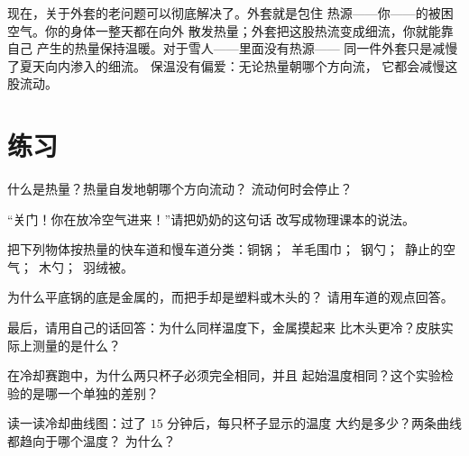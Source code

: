 \begin{remark}[保暖的正确说法]\label{rem:g5:heat-and-insulation:coat}
现在，关于外套的老问题可以彻底解决了。外套就是包住
热源——你——的被困空气。你的身体一整天都在向外
散发热量；外套把这股热流变成细流，你就能靠自己
产生的热量保持温暖。对于雪人——里面没有热源——
同一件外套只是减慢了夏天向内渗入的细流。
保温没有偏爱：无论热量朝哪个方向流，
它都会减慢这股流动。
\end{remark}

\section{练习}

\begin{exercise}[$\star$]\label{exo:g5:heat-and-insulation:1}
什么是热量？热量自发地朝哪个方向流动？
流动何时会停止？
\end{exercise}

\begin{exercise}[$\star$]\label{exo:g5:heat-and-insulation:2}
“关门！你在放冷空气进来！”请把奶奶的这句话
改写成物理课本的说法。
\end{exercise}

\begin{exercise}[$\star$]\label{exo:g5:heat-and-insulation:3}
把下列物体按热量的快车道和慢车道分类：铜锅；\ 
羊毛围巾；\ 钢勺；\ 静止的空气；\ 木勺；\ 
羽绒被。
\end{exercise}

\begin{exercise}[$\star$]\label{exo:g5:heat-and-insulation:4}
为什么平底锅的底是金属的，而把手却是塑料或木头的？
请用车道的观点回答。
\end{exercise}

\begin{exercise}[$\star$]\label{exo:g5:heat-and-insulation:5}
最后，请用自己的话回答：为什么同样温度下，金属摸起来
比木头更冷？皮肤实际上测量的是什么？
\end{exercise}

\begin{exercise}[$\star$]\label{exo:g5:heat-and-insulation:6}
在冷却赛跑中，为什么两只杯子必须完全相同，并且
起始温度相同？这个实验检验的是哪一个单独的差别？
\end{exercise}

\begin{exercise}[$\star$]\label{exo:g5:heat-and-insulation:7}
读一读冷却曲线图：过了 $15$ 分钟后，每只杯子显示的温度
大约是多少？两条曲线都趋向于哪个温度？
为什么？
\end{exercise}

